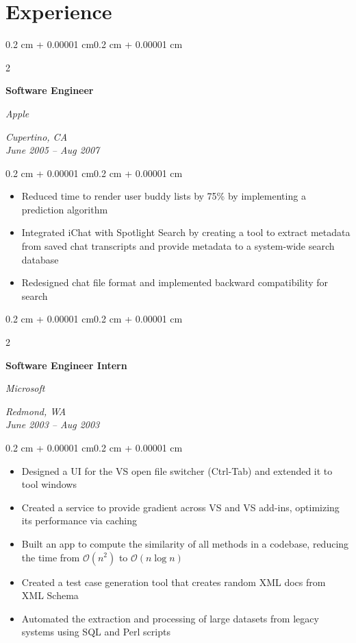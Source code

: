 \documentclass[10pt, letterpaper]{article}
\newenvironment{highlights}{
    \begin{itemize}[
        topsep=0.10 cm,
        parsep=0.10 cm,
        partopsep=0pt,
        itemsep=0pt,
        leftmargin=0.4 cm + 10pt
    ]
}{
    \end{itemize}
}
\newenvironment{onecolentry}{
    \begin{adjustwidth}{0.2 cm + 0.00001 cm}{0.2 cm + 0.00001 cm}
}{
    \end{adjustwidth}
}
\newenvironment{twocolentry}[2][]{
    \onecolentry
    \def\secondColumn{#2}
    \setcolumnwidth{\fill, 4.5 cm}
    \begin{paracol}{2}
}{
    \switchcolumn \raggedleft \secondColumn
    \end{paracol}
    \endonecolentry
}
\begin{document}
    \section{Experience}

    \begin{twocolentry}{\textit{Cupertino, CA \\ June 2005 – Aug 2007}}
        \textbf{Software Engineer}
        
        \textit{Apple}
    \end{twocolentry}

    \vspace{0.10 cm}
    
    \begin{onecolentry}
        \begin{highlights}
            \item Reduced time to render user buddy lists by 75\% by implementing a prediction algorithm
            \item Integrated iChat with Spotlight Search by creating a tool to extract metadata from saved chat transcripts and provide metadata to a system-wide search database
            \item Redesigned chat file format and implemented backward compatibility for search
        \end{highlights}
    \end{onecolentry}

    \vspace{0.2 cm}

    \begin{twocolentry}{\textit{Redmond, WA \\ June 2003 – Aug 2003}}
        \textbf{Software Engineer Intern}
        
        \textit{Microsoft}
    \end{twocolentry}

    \vspace{0.10 cm}
    
    \begin{onecolentry}
        \begin{highlights}
            \item Designed a UI for the VS open file switcher (Ctrl-Tab) and extended it to tool windows
            \item Created a service to provide gradient across VS and VS add-ins, optimizing its performance via caching
            \item Built an app to compute the similarity of all methods in a codebase, reducing the time from $\mathcal{O}(n^2)$ to $\mathcal{O}(n \log n)$
            \item Created a test case generation tool that creates random XML docs from XML Schema
            \item Automated the extraction and processing of large datasets from legacy systems using SQL and Perl scripts
        \end{highlights}
    \end{onecolentry}
\end{document}
